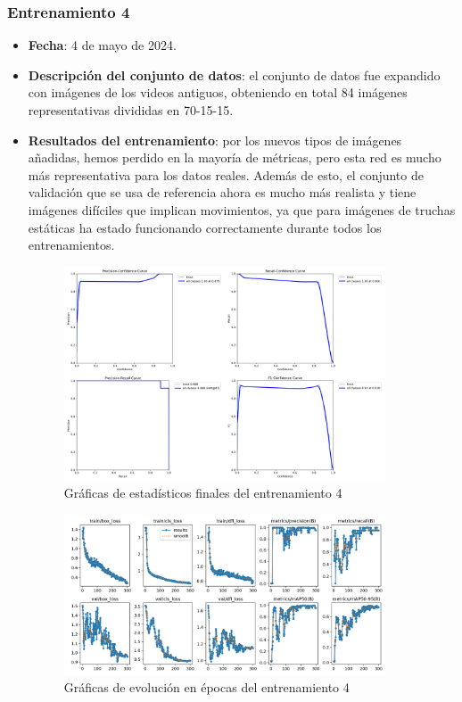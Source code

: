 \subsubsection*{Entrenamiento 4}
\label{train:4}
\begin{itemize}
    \item \textbf{Fecha}: 4 de mayo de 2024.
    \item \textbf{Descripción del conjunto de datos}: el conjunto de datos fue expandido con imágenes de los videos antiguos, obteniendo en total 84 imágenes representativas divididas en 70-15-15.
    \item \textbf{Resultados del entrenamiento}: por los nuevos tipos de imágenes añadidas, hemos perdido en la mayoría de métricas, pero esta red es mucho más representativa para los datos reales. 
    Además de esto, el conjunto de validación que se usa de referencia ahora es mucho más realista y tiene imágenes difíciles que implican movimientos, ya que para imágenes de truchas estáticas ha 
    estado funcionando correctamente durante todos los entrenamientos.
    
    \begin{figure}[H]
        \centering
        \includegraphics[width=0.9\textwidth]{images/13/b/4/graficas2.png}
        \caption{Gráficas de estadísticos finales del entrenamiento 4}
        \label{fig:Estadisticos4}
    \end{figure}
    \begin{figure}[H]
        \centering
        \includegraphics[width=0.9\textwidth]{images/13/b/4/results.png}
        \caption{Gráficas de evolución en épocas del entrenamiento 4}
        \label{fig:Resultados4}
    \end{figure}

\end{itemize}

